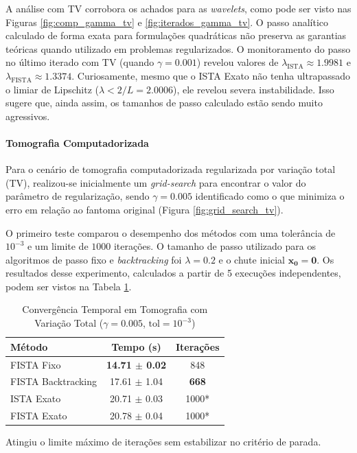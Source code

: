 \documentclass[12pt]{article}
\begin{document}
A análise com TV corrobora os achados para as \textit{wavelets}, como pode ser visto nas Figuras \ref{fig:comp_gamma_tv} e \ref{fig:iterados_gamma_tv}. O passo analítico calculado de forma exata para formulações quadráticas não preserva as garantias teóricas quando utilizado em problemas regularizados. O monitoramento do passo no último iterado com TV (quando $\gamma = 0.001$) revelou valores de $\lambda_{\text{ISTA}} \approx 1.9981$ e $\lambda_{\text{FISTA}} \approx 1.3374$. Curiosamente, mesmo que o ISTA Exato não tenha ultrapassado o limiar de Lipschitz ($\lambda < 2/L = 2.0006$), ele revelou severa instabilidade. Isso sugere que, ainda assim, os tamanhos de passo calculado estão sendo muito agressivos.

\paragraph{Tomografia Computadorizada}
Para o cenário de tomografia computadorizada regularizada por variação total (TV), realizou-se inicialmente um \textit{grid-search} para encontrar o valor do parâmetro de regularização, sendo $\gamma = 0.005$ identificado como o que minimiza o erro em relação ao fantoma original (Figura \ref{fig:grid_search_tv}). 

O primeiro teste comparou o desempenho dos métodos com uma tolerância de $10^{-3}$ e um limite de $1000$ iterações. O tamanho de passo utilizado para os algoritmos de passo fixo e \textit{backtracking} foi $\lambda = 0.2$ e o chute inicial $\mathbf{x_0} = \mathbf{0}$. Os resultados desse experimento, calculados a partir de 5 execuções independentes, podem ser vistos na Tabela \ref{tab:tc_tv_conv_principal}.
\begin{table}[H]
    \centering
    \caption{Convergência Temporal em Tomografia com Variação Total ($\gamma=0.005$, $\text{tol}=10^{-3}$)}
    \label{tab:tc_tv_conv_principal}
    \begin{tabular}{lcc}
        \toprule
        \textbf{Método} & \textbf{Tempo (s)} & \textbf{Iterações} \\
        \midrule
        FISTA Fixo & \textbf{14.71 $\pm$ 0.02} & 848 \\
        FISTA Backtracking & 17.61 $\pm$ 1.04 & \textbf{668} \\
        ISTA Exato & 20.71 $\pm$ 0.03 & 1000* \\
        FISTA Exato & 20.78 $\pm$ 0.04 & 1000* \\
        \bottomrule
    \end{tabular}
    
    \vspace{0.1cm}
    {\footnotesize *Atingiu o limite máximo de iterações sem estabilizar no critério de parada.}
\end{table}
\end{document}

